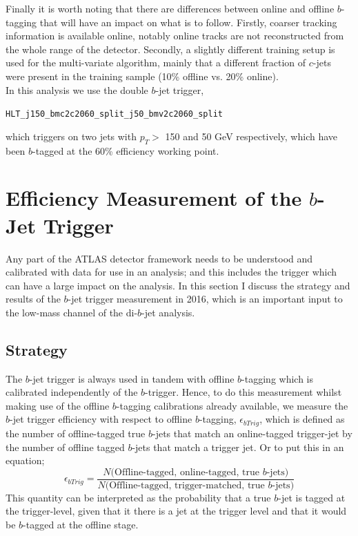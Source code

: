 Finally it is worth noting that there are  differences between online and offline $b$-tagging that will have an impact on what is to follow.
Firstly, coarser tracking information is available online, notably online tracks are not reconstructed from the whole range of the detector.
Secondly, a slightly different training setup is used for the multi-variate algorithm, mainly that a different fraction of $c$-jets were present in the training sample
(10\% offline vs. 20\% online).\\

In this analysis we use the double $b$-jet trigger,
\begin{center}
\verb|HLT_j150_bmc2c2060_split_j50_bmv2c2060_split|
\end{center}
which triggers on two jets with $p_T >$ 150 and 50 GeV respectively,
which have been $b$-tagged at the 60\% efficiency working point.\\

\section{Efficiency Measurement of the $b$-Jet Trigger}
\label{sec:trig-bjet_eff}

Any part of the ATLAS detector framework needs to be understood and calibrated with data for use in an analysis;
and this includes the trigger which can have a large impact on the analysis.
In this section I discuss the strategy and results of the $b$-jet trigger measurement in 2016,
which is an important input to the low-mass channel of the di-$b$-jet analysis.
\\

\subsection{Strategy}
The $b$-jet trigger is always used in tandem with offline $b$-tagging which is calibrated independently of the $b$-trigger.
Hence, to do this measurement whilst making use of the offline $b$-tagging calibrations already available,
we measure the $b$-jet trigger efficiency with respect to offline $b$-tagging, $\epsilon_{bTrig}$,
which is defined as the number of offline-tagged true $b$-jets that match an online-tagged trigger-jet by the number of offline tagged $b$-jets that match a trigger jet.
Or to put this in an equation;
\begin{equation}
 \epsilon_{bTrig} = \frac{N(\text{Offline-tagged, online-tagged, true $b$-jets)}}{N(\text{Offline-tagged, trigger-matched, true $b$-jets)}}
\end{equation}
This quantity can be interpreted as the probability that a true $b$-jet is tagged at the trigger-level,
given that it there is a jet at the trigger level and that it would be $b$-tagged at the offline stage.

